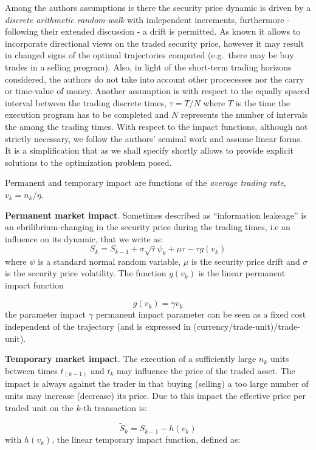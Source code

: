 Among the authors assumptions is there the security price dynamic is
driven by a \emph{discrete arithmetic random-walk} with independent
increments, furthermore - following their extended discussion - a drift
is permitted. As known it allows to incorporate directional views on the
traded security price, however it may result in changed signs of the
optimal trajectories computed (e.g.~there may be buy trades in a selling
program). Also, in light of the short-term trading horizons considered,
the authors do not take into account other procecesses nor the carry or
time-value of money. Another assumption is with respect to the equally
spaced interval between the trading discrete times, \(\tau = T/N\) where
\(T\) is the time the execution program has to be completed and \(N\)
represents the number of intervals the among the trading times. With
respect to the impact functions, although not strictly necessary, we
follow the authors' seminal work and assume linear forms. It is a
simplification that as we shall specify shortly allows to provide
explicit solutions to the optimization problem posed.

Permanent and temporary impact are functions of the
\emph{average trading rate}, \(v_{k} = n_{k}/\eta\).

\textbf{Permanent market impact}. Sometimes described as ``information
leakeage'' is an ebrilibrium-changing in the security price during the
trading times, i.e an influence on its dynamic, that we write as:
\[ S_{k} = S_{k-1} + \sigma\sqrt{\tau}\psi_{k} + \mu\tau - \tau g(v_{k}) \]
where \(\psi\) is a standard normal random variable, \(\mu\) is the
security price drift and \(\sigma\) is the security price volatility.
The function \(g(v_{k})\) is the linear permanent impact function

\[ g(v_{k}) = \gamma v_{k} \] the parameter impact \(\gamma\) permanent
impact parameter can be seen as a fixed cost independent of the
trajectory (and is expressed in (currency/trade-unit)/trade-unit).

\textbf{Temporary market impact}. The execution of a sufficiently large
\(n_{k}\) units between times \(t_(k - 1)\) and \(t_k\) may influence
the price of the traded asset. The impact is always against the trader
in that buying (selling) a too large number of units may increase
(decrease) its price. Due to this impact the effective price per traded
unit on the \(k\)-th transaction is:

\[ \tilde{S}_{k} = S_{k-1} - h(v_{k}) \] with \(h(v_{k})\), the linear
temporary impact function, defined as:

